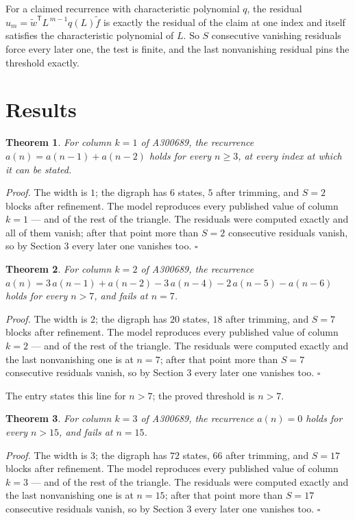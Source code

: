 \documentclass[11pt]{article}
\newtheorem{theorem}{Theorem}
\theoremstyle{definition}
\begin{document}
For a claimed recurrence with characteristic polynomial $q$, the residual $u_m = \tilde w^{\mathsf T}L^{\,m-1}q(L)\tilde f$ is exactly the residual of the claim at one index and itself satisfies the characteristic polynomial of $L$. So $S$ consecutive vanishing residuals force every later one, the test is finite, and the last nonvanishing residual pins the threshold exactly.

\section{Results}

\begin{theorem} For column $k = 1$ of A300689, the recurrence $a(n) = a(n-1) + a(n-2)$ holds for every $n \ge 3$, at every index at which it can be stated.\end{theorem}

{\itshape Proof.} The width is $1$; the digraph has $6$ states, $5$ after trimming, and $S = 2$ blocks after refinement. The model reproduces every published value of column $k = 1$ --- and of the rest of the triangle. The residuals were computed exactly and all of them vanish; after that point more than $S = 2$ consecutive residuals vanish, so by Section 3 every later one vanishes too. $\square$

\begin{theorem} For column $k = 2$ of A300689, the recurrence $a(n) = 3\,a(n-1) + a(n-2) - 3\,a(n-4) - 2\,a(n-5) - a(n-6)$ holds for every $n > 7$, and fails at $n = 7$.\end{theorem}

{\itshape Proof.} The width is $2$; the digraph has $20$ states, $18$ after trimming, and $S = 7$ blocks after refinement. The model reproduces every published value of column $k = 2$ --- and of the rest of the triangle. The residuals were computed exactly and the last nonvanishing one is at $n = 7$; after that point more than $S = 7$ consecutive residuals vanish, so by Section 3 every later one vanishes too. $\square$

The entry states this line for $n > 7$; the proved threshold is $n > 7$.

\begin{theorem} For column $k = 3$ of A300689, the recurrence $a(n) = 0$ holds for every $n > 15$, and fails at $n = 15$.\end{theorem}

{\itshape Proof.} The width is $3$; the digraph has $72$ states, $66$ after trimming, and $S = 17$ blocks after refinement. The model reproduces every published value of column $k = 3$ --- and of the rest of the triangle. The residuals were computed exactly and the last nonvanishing one is at $n = 15$; after that point more than $S = 17$ consecutive residuals vanish, so by Section 3 every later one vanishes too. $\square$
\end{document}
